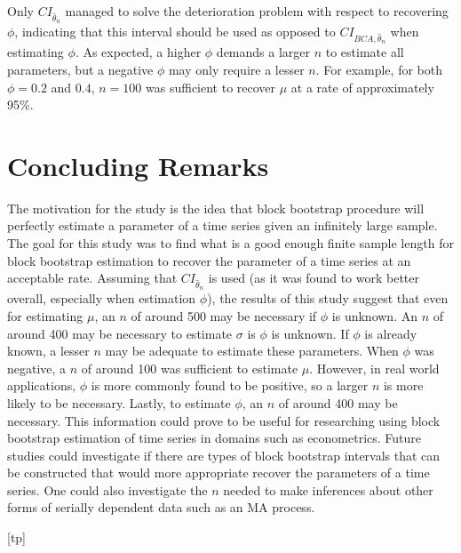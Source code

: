 \documentclass[12pt, letterpaper, titlepage]{article}
\begin{document}
Only $CI_{\hat{\theta}_{n}}$ managed to solve the deterioration problem with respect to recovering $\phi$, indicating that this interval 
should be used as opposed to $CI_{BCA, \hat{\theta}_{n}}$ when estimating $\phi$. As expected, a higher $\phi$ demands a 
larger $n$ to estimate all parameters, but a negative $\phi$ may only require a lesser $n$. For example, for both $\phi = 0.2$ and $0.4$, 
$n = 100$ was sufficient to recover $\mu$ at a rate of approximately 95\%.

\section{Concluding Remarks}
\label{sec:conremarks}

The motivation for the study is the idea that block bootstrap procedure will perfectly estimate a parameter of a time series given an infinitely large sample. 
The goal for this study was to find what is a good enough finite sample length for block bootstrap estimation to recover the parameter of a 
time series at an acceptable rate. Assuming that $CI_{\hat{\theta}_{n}}$ is used (as it was found to work better overall, especially when estimation $\phi$), 
the results of this study suggest that even for estimating $\mu$, an $n$ of around 500 may be necessary if $\phi$ is unknown. 
An $n$ of around 400 may be necessary to estimate $\sigma$ is $\phi$ is unknown. If $\phi$ is already known, 
a lesser $n$ may be adequate to estimate these parameters. When $\phi$ was negative, 
a $n$ of around 100 was sufficient to estimate $\mu$. However, in real world applications, $\phi$ is more commonly found to be positive, 
so a larger $n$ is more likely to be necessary. Lastly, to estimate $\phi$, an $n$ of around 400 may be necessary. 
This information could prove to be useful for researching using block bootstrap estimation of time series in domains such as econometrics. 
Future studies could investigate if there are types of block bootstrap intervals that can be constructed that 
would more appropriate recover the parameters of a time series. One could also investigate the $n$ needed to 
make inferences about other forms of serially dependent data such as an MA process.



[tp]
\end{document}

